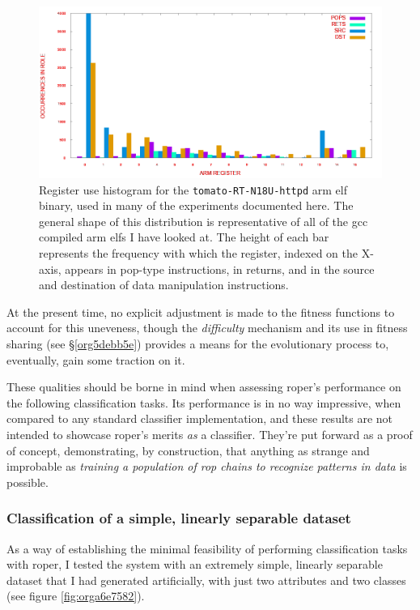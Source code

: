 \documentclass[12pt,glossary]{dalthesis}
\begin{document}
\begin{figure}[htbp]
\centering
\includegraphics[width=.9\linewidth]{../images/plots/tomato-register-histogram.png}
\caption{\label{fig:org834fd5e}
Register use histogram for the \texttt{tomato-RT-N18U-httpd} \gls{arm} \gls{elf} binary, used in many of the experiments documented here. The general shape of this distribution is representative of all of the \gls{gcc} compiled \gls{arm} \glspl{elf} I have looked at. The height of each bar represents the frequency with which the register, indexed on the X-axis, appears in pop-type instructions, in returns, and in the source and destination of data manipulation instructions.}
\end{figure}

At the present time, no explicit adjustment is made to the fitness functions
to account for this uneveness, though the \emph{difficulty} mechanism and its use in
fitness sharing (see \S \ref{org5debb5e}) provides a means for the evolutionary
process to, eventually, gain some traction on it.

These qualities should be borne in mind when assessing \gls{roper}'s performance
on the following classification tasks. Its performance is in no way impressive,
when compared to any standard classifier implementation, and these results are
not intended to showcase \gls{roper}'s merits \emph{as} a classifier. They're put
forward as a proof of concept, demonstrating, by construction, that anything as
strange and improbable as \emph{training a population of \gls{rop} chains to recognize
patterns in data} is possible.

\subsubsection{Classification of a simple, linearly separable dataset}
\label{sec:org6d1d0b8}
\label{org87e77e4}

As a way of establishing the minimal feasibility of performing classification
tasks with \gls{roper}, I tested the system with an extremely simple, linearly
separable dataset that I had generated artificially, with just two attributes
and two classes (see figure \ref{fig:orga6e7582}).
\end{document}
